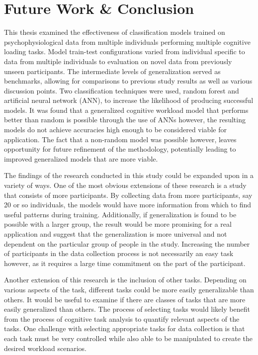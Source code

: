 \documentclass[11pt]{article}
\begin{document}
	
\section{Future Work \& Conclusion}
	This thesis examined the effectiveness of classification models trained on psychophysiological data from multiple individuals performing multiple cognitive loading tasks. Model train-test configurations varied from individual specific to data from multiple individuals to evaluation on novel data from previously unseen participants. The intermediate levels of generalization served as benchmarks, allowing for comparisons to previous study results as well as various discussion points. Two classification techniques were used, random forest and artificial neural network (ANN), to increase the likelihood of producing successful models. It was found that a generalized cognitive workload model that performs better than random is possible through the use of ANNs however, the resulting models do not achieve accuracies high enough to be considered viable for application. The fact that a non-random model was possible however, leaves opportunity for future refinement of the methodology, potentially leading to improved generalized models that are more viable.
	
	The findings of the research conducted in this study could be expanded upon in a variety of ways. One of the most obvious extensions of these research is a study that consists of more participants. By collecting data from more participants, say 20 or so individuals, the models would have more information from which to find useful patterns during training. Additionally, if generalization is found to be possible with a larger group, the result would be more promising for a real application and suggest that the generalization is more universal and not dependent on the particular group of people in the study. Increasing the number of participants in the data collection process is not necessarily an easy task however, as it requires a large time commitment on the part of the participant.
	
	Another extension of this research is the inclusion of other tasks. Depending on various aspects of the task, different tasks could be more easily generalizable than others. It would be useful to examine if there are classes of tasks that are more easily generalized than others. The process of selecting tasks would likely benefit from the process of cognitive task analysis to quantify relevant aspects of the tasks. One challenge with selecting appropriate tasks for data collection is that each task must be very controlled while also able to be manipulated to create the desired workload scenarios. 
	
\end{document}

